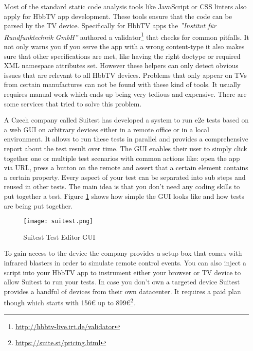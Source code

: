 Most of the standard static code analysis tools like JavaScript or CSS linters also apply for HbbTV app development. These tools ensure that the code can be parsed by the TV device. Specifically for HbbTV apps the \textit{''Institut für Rundfunktechnik GmbH''} authored a validator\footnote{\url{http://hbbtv-live.irt.de/validator}} that checks for common pitfalls. It not only warns you if you serve the app with a wrong content-type it also makes sure that other specifications are met, like having the right doctype or required XML namespace attributes set. However these helpers can only detect obvious issues that are relevant to all HbbTV devices. Problems that only appear on TVs from certain manufactures can not be found with these kind of tools. It usually requires manual work which ends up being very tedious and expensive. There are some services that tried to solve this problem.

A Czech company called Suitest has developed a system to run e2e tests based on a web GUI on arbitrary devices either in a remote office or in a local environment. It allows to run these tests in parallel and provides a comprehensive report about the test result over time. The GUI enables their user to simply click together one or multiple test scenarios with common actions like: open the app via URL, press a button on the remote and assert that a certain element contains a certain property. Every aspect of your test can be separated into sub steps and reused in other tests. The main idea is that you don't need any coding skills to put together a test. Figure \ref{fig:suitest} shows how simple the GUI looks like and how tests are being put together.

\begin{figure}[htb]
  \centering
  \texttt{[image: suitest.png]}\\
  \caption{Suitest Test Editor GUI}\label{fig:suitest}
\end{figure}

To gain access to the device the company provides a setup box that comes with infrared blasters in order to simulate remote control events. You can also inject a script into your HbbTV app to instrument either your browser or TV device to allow Suitest to run your tests. In case you don't own a targeted device Suitest provides a handful of devices from their own datacenter. It requires a paid plan though which starts with 156\euro{} up to 899\euro{}\footnote{\url{https://suite.st/pricing.html}}.

